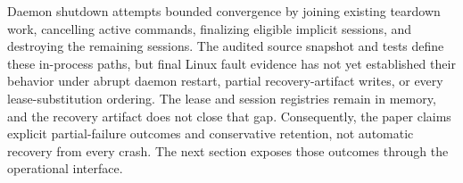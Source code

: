 Daemon shutdown attempts bounded convergence by joining existing teardown
work, cancelling active commands, finalizing eligible implicit sessions, and
destroying the remaining sessions.  The audited source snapshot and tests define
these in-process paths, but final Linux fault evidence has not yet established
their behavior under abrupt daemon restart, partial recovery-artifact writes,
or every lease-substitution ordering.  The lease and session registries remain
in memory, and the recovery artifact does not close that gap.  Consequently,
the paper claims explicit partial-failure outcomes and conservative retention,
not automatic recovery from every crash.  The next section exposes those
outcomes through the operational interface.

\clearpage
